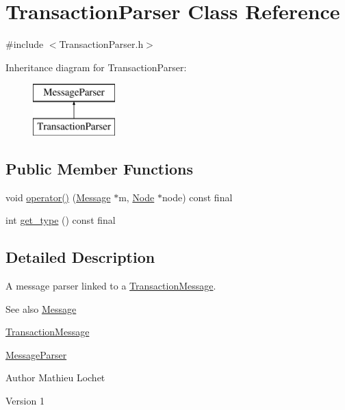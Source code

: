 \hypertarget{classTransactionParser}{}\section{Transaction\+Parser Class Reference}
\label{classTransactionParser}


{\ttfamily \#include $<$Transaction\+Parser.\+h$>$}

Inheritance diagram for Transaction\+Parser\+:\begin{figure}[H]
\begin{center}
\leavevmode
\includegraphics[height=2.000000cm]{classTransactionParser}
\end{center}
\end{figure}
\subsection*{Public Member Functions}
\begin{DoxyCompactItemize}
\item 
void \mbox{\hyperlink{classTransactionParser_addb18b5cb23a07ef6a46c4d89a1c9f23}{operator()}} (\mbox{\hyperlink{classMessage}{Message}} $\ast$m, \mbox{\hyperlink{classNode}{Node}} $\ast$node) const final
\item 
int \mbox{\hyperlink{classTransactionParser_a34bed6ceb924ae378b3b2e89a29ae230}{get\+\_\+type}} () const final
\end{DoxyCompactItemize}


\subsection{Detailed Description}
A message parser linked to a \mbox{\hyperlink{classTransactionMessage}{Transaction\+Message}}. \begin{DoxySeeAlso}{See also}
\mbox{\hyperlink{classMessage}{Message}} 

\mbox{\hyperlink{classTransactionMessage}{Transaction\+Message}} 

\mbox{\hyperlink{classMessageParser}{Message\+Parser}}
\end{DoxySeeAlso}
\begin{DoxyAuthor}{Author}
Mathieu Lochet 
\end{DoxyAuthor}
\begin{DoxyVersion}{Version}
1 
\end{DoxyVersion}


